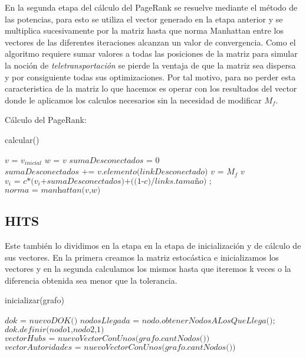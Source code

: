 En la segunda etapa del cálculo del PageRank se resuelve mediante el método de las potencias, para esto se utiliza el vector generado en la etapa anterior y se multiplica sucesivamente por la matriz hasta que norma Manhattan entre los vectores de las diferentes iteraciones alcanzan un valor de convergencia. Como el algoritmo requiere sumar valores a todas las posiciones de la matriz para simular la noción de \textit{teletransportación} se pierde la ventaja de que la matriz sea dispersa y por consiguiente todas sus optimizaciones. Por tal motivo, para no perder esta caracteristica de la matriz lo que hacemos es operar con los resultados del vector donde le aplicamos los calculos necesarios sin la necesidad de modificar $M_f$.

Cálculo del PageRank:
\begin{algorithm}
\caption{calcular()}\label{euclid}
\begin{algorithmic}[1]
\State  $\textit{v = $v_{inicial}$}$
 
	\State $\textit{w = v}$ 
	\State  $\textit{sumaDesconectados = 0}$
		\State $\textit{sumaDesconectados += v.elemento(linkDesconectado)}$ \Comment{}
	\EndFor
	\State $\textit{v = $M_f$ v}$ 
		\State $\textit{$v_i$ = c*($v_i$+sumaDesconectados)+((1-c)/links.tamaño)  ;}$ \Comment{}
	\EndFor
	\State $\textit{norma = manhattan(v,w)}$ 
\EndWhile
\end{algorithmic}
\end{algorithm}
 
\newpage
\subsection{HITS}
Este también lo dividimos en la etapa en la etapa de inicialización y de cálculo de sus vectores. En la primera creamos la matriz estocástica e inicializamos los vectores y en la segunda calculamos los mismos hasta que iteremos k veces o la diferencia obtenida sea menor que la tolerancia.

\begin{algorithm}
\caption{inicializar(grafo)}\label{euclid}
\begin{algorithmic}[1]
\State  $\textit{dok = nuevoDOK()}$
	\State $\textit{nodosLlegada = nodo.obtenerNodosALosQueLlega();}$	
		\State $\textit{dok.definir(nodo1,nodo2,1)}$ 
	\EndFor	
\EndFor
\State  $\textit{vectorHubs = nuevoVectorConUnos(grafo.cantNodos())}$
\State  $\textit{vectorAutoridades = nuevoVectorConUnos(grafo.cantNodos())}$
\end{algorithmic}
\end{algorithm}

